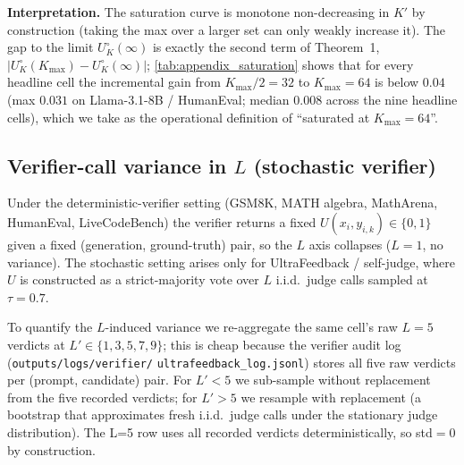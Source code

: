 \textbf{Interpretation.} The saturation curve is monotone non-decreasing
in $K'$ by construction (taking the max over a larger set can only
weakly increase it). The gap to the limit $U^\circ_K(\infty)$ is exactly
the second term of Theorem~1, $|U^\circ_K(K_{\max}) - U^\circ_K(\infty)|$;
\cref{tab:appendix_saturation} shows that for every headline cell the
incremental gain from $K_{\max}/2{=}32$ to $K_{\max}{=}64$ is below
$0.04$ (max $0.031$ on Llama-3.1-8B / HumanEval; median $0.008$
across the nine headline cells), which we take as the operational
definition of ``saturated at $K_{\max}{=}64$''.

\subsection{Verifier-call variance in \texorpdfstring{$L$}{L} (stochastic verifier)}
\label{app:calibration:L}

Under the deterministic-verifier setting (GSM8K, MATH algebra, MathArena,
HumanEval, LiveCodeBench) the verifier returns a fixed
$U(x_i, y_{i,k}) \in \{0,1\}$ given a fixed (generation, ground-truth)
pair, so the $L$ axis collapses ($L=1$, no variance). The stochastic
setting arises only for UltraFeedback / self-judge, where $U$ is
constructed as a strict-majority vote over $L$ i.i.d.\ judge calls
sampled at $\tau=0.7$.

To quantify the $L$-induced variance we re-aggregate the same cell's
raw $L=5$ verdicts at $L' \in \{1, 3, 5, 7, 9\}$; this is cheap because
the verifier audit log (\texttt{outputs/logs/verifier/}\allowbreak%
\texttt{ultrafeedback\_log.jsonl}) stores all five raw verdicts per
(prompt, candidate) pair. For $L'<5$ we sub-sample without
replacement from the five recorded verdicts; for $L'>5$ we resample
with replacement (a bootstrap that approximates fresh i.i.d.\ judge
calls under the stationary judge distribution). The L=5 row uses all
recorded verdicts deterministically, so std$=0$ by construction.

